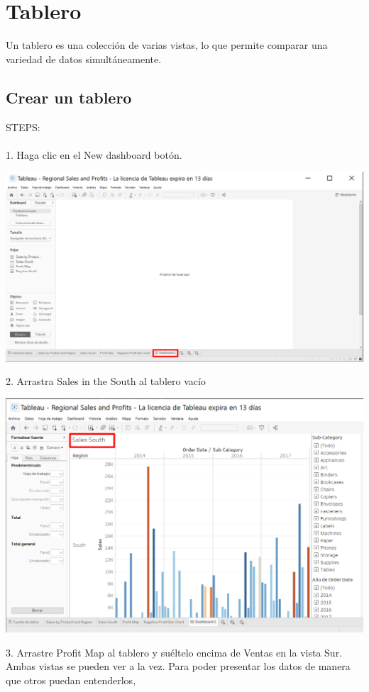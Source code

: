 \documentclass[12pt,letterpaper]{article}
\begin{document}
\section{Tablero}
Un tablero es una colección de varias vistas, lo que permite comparar una variedad de
datos simultáneamente.
\subsection{Crear un tablero}
STEPS:
\\\\1. Haga clic en el New dashboard botón.
\begin{center}
    \includegraphics[width=16cm]{img/46.png}  
\end{center}
2. Arrastra Sales in the South al tablero vacío
\begin{center}
    \includegraphics[width=16cm]{img/47.png}  
\end{center}
3. Arrastre Profit Map al tablero y suéltelo encima de Ventas en la vista Sur. Ambas vistas se
pueden ver a la vez. Para poder presentar los datos de manera que otros puedan entenderlos,
\end{document}
